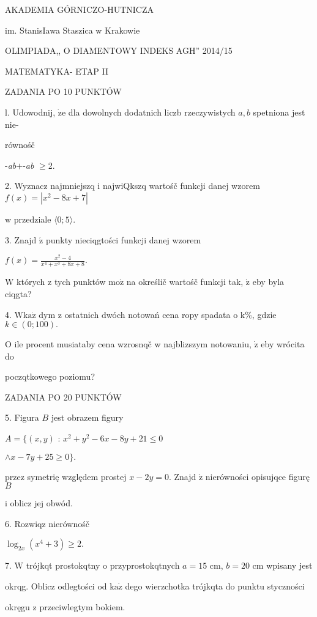 \documentclass[a4paper,12pt]{article}
\begin{document}
AKADEMIA GÓRNICZO-HUTNICZA

im. StanisIawa Staszica w Krakowie

OLIMPIADA,, O DIAMENTOWY INDEKS AGH'' 2014/15

MATEMATYKA- ETAP II

ZADANIA PO 10 PUNKTÓW

l. Udowodnij, $\dot{\mathrm{z}}\mathrm{e}$ dla dowolnych dodatnich liczb rzeczywistych $a, b$ spetniona jest nie-

równośč

-{\it ab}$+$-{\it ab} $\geq$2.

2. Wyznacz najmniejszq i najwiQkszq wartośč funkcji danej wzorem $f(x)=|x^{2}-8x+7|$

w przedziale $\langle 0;5\rangle.$

3. Znajd $\acute{\mathrm{z}}$ punkty nieciqgtości funkcji danej wzorem

$f(x)=\displaystyle \frac{x^{2}-4}{x^{4}+x^{3}+8x+8}.$

$\mathrm{W}$ których z tych punktów $\mathrm{m}\mathrm{o}\dot{\mathrm{z}}$ na określič wartośč funkcji tak, $\dot{\mathrm{z}}$ eby byla ciqgta?

4. $\mathrm{W}\mathrm{k}\mathrm{a}\dot{\mathrm{z}}$ dym z ostatnich dwóch notowań cena ropy spadata o k\%, gdzie $k\in(0;100).$

$\mathrm{O}$ ile procent musiataby cena wzrosnqč w najblizszym notowaniu, $\dot{\mathrm{z}}$ eby wrócita do

poczqtkowego poziomu?

ZADANIA PO 20 PUNKTÓW

5. Figura $B$ jest obrazem figury

$A=\{(x,y)$ : $x^{2}+y^{2}-6x-8y+21\leq 0$

$\wedge x-7y+25\geq 0\}.$

przez symetrię względem prostej $x-2y=0.$ Znajd $\acute{\mathrm{z}}$ nierówności opisujqce figurę $B$

i oblicz jej obwód.

6. Rozwiqz nierównośč

$\log_{2x}(x^{4}+3)\geq 2.$

7. $\mathrm{W}$ trójkqt prostokqtny o przyprostokqtnych $a = 15$ cm, $b = 20$ cm wpisany jest

okrqg. Oblicz odlegtości od $\mathrm{k}\mathrm{a}\dot{\mathrm{z}}$ dego wierzchotka trójkqta do punktu styczności

okręgu z przeciwlegtym bokiem.
\end{document}
